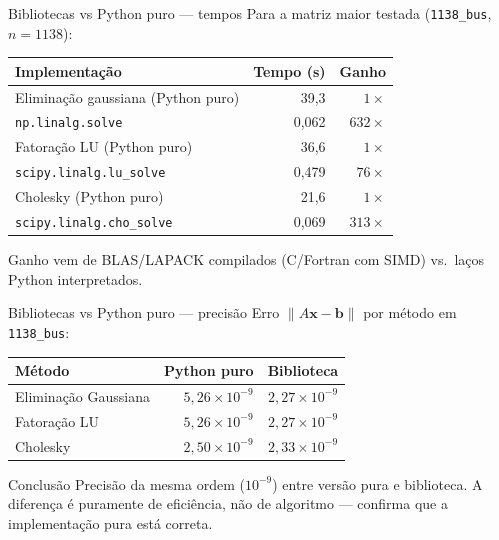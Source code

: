 \documentclass[10pt,aspectratio=169]{beamer}
\begin{document}
\begin{frame}{Bibliotecas vs Python puro --- tempos}
  Para a matriz maior testada (\texttt{1138\_bus}, $n = 1138$):

  \vspace{0.5em}
  \begin{table}
  \centering
  \small
  \begin{tabular}{lrr}
    \toprule
    \textbf{Implementação} & \textbf{Tempo (s)} & \textbf{Ganho} \\
    \midrule
    Eliminação gaussiana (Python puro) & 39{,}3   & $1\times$ \\
    \texttt{np.linalg.solve}            & 0{,}062 & \alert{$632\times$} \\
    Fatoração LU (Python puro)         & 36{,}6   & $1\times$ \\
    \texttt{scipy.linalg.lu\_solve}    & 0{,}479  & \alert{$76\times$} \\
    Cholesky (Python puro)              & 21{,}6  & $1\times$ \\
    \texttt{scipy.linalg.cho\_solve}    & 0{,}069 & \alert{$313\times$} \\
    \bottomrule
  \end{tabular}
  \end{table}

  \vspace{0.6em}
  Ganho vem de BLAS/LAPACK compilados (C/Fortran com SIMD) vs.\ laços Python interpretados.
\end{frame}

\begin{frame}{Bibliotecas vs Python puro --- precisão}
  Erro $\|A\mathbf{x} - \mathbf{b}\|$ por método em \texttt{1138\_bus}:

  \vspace{0.5em}
  \begin{table}
  \centering
  \small
  \begin{tabular}{lrr}
    \toprule
    \textbf{Método} & \textbf{Python puro} & \textbf{Biblioteca} \\
    \midrule
    Eliminação Gaussiana & $5{,}26 \times 10^{-9}$ & $2{,}27 \times 10^{-9}$ \\
    Fatoração LU         & $5{,}26 \times 10^{-9}$ & $2{,}27 \times 10^{-9}$ \\
    Cholesky             & $2{,}50 \times 10^{-9}$ & $2{,}33 \times 10^{-9}$ \\
    \bottomrule
  \end{tabular}
  \end{table}

  \vspace{0.8em}
  \begin{alertblock}{Conclusão}
    Precisão da \alert{mesma ordem} ($10^{-9}$) entre versão pura e biblioteca.
    A diferença é \alert{puramente de eficiência}, não de algoritmo --- confirma que a implementação pura está \alert{correta}.
  \end{alertblock}
\end{frame}
\end{document}
